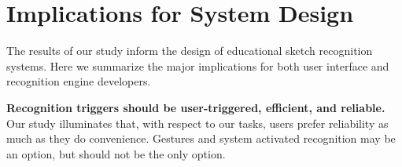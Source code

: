 \documentclass{elsart}
\begin{document}




 
\section{Implications for System Design}
The results of our study inform the design of educational sketch
recognition systems.  Here we summarize the major implications for
both user interface and recognition engine developers.  

\textbf{Recognition triggers should be user-triggered, efficient, and
reliable.} Our study illuminates that, with respect to our tasks, users
prefer reliability as much as they do convenience.  Gestures and
system activated recognition may be an option, but should not be the
only option.  
\end{document}
